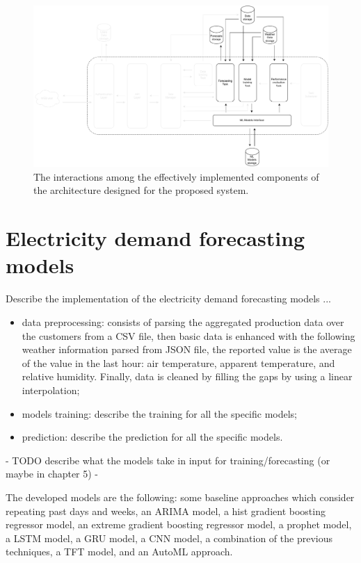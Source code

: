 \begin{figure}[t]
\centering
\includegraphics[width=1\textwidth]{images/implementation_interactions}
\caption{The interactions among the effectively implemented components of the architecture designed for the proposed system.}
\label{fig:implementationinteractions}
\end{figure}


\section{Electricity demand forecasting models}
\label{sec:demandimpl}
\vspace{0.2 cm}

Describe the implementation of the electricity demand forecasting models ...
\begin{itemize}
  \item data preprocessing: consists of parsing the aggregated production data over the customers from a CSV file, then basic data is enhanced with the following weather information parsed from JSON file, the reported value is the average of the value in the last hour: air temperature, apparent temperature, and relative humidity. Finally, data is cleaned by filling the gaps by using a linear interpolation;
  \item models training: describe the training for all the specific models;
  \item prediction: describe the prediction for all the specific models.
\end{itemize}


 - TODO describe what the models take in input for training/forecasting (or maybe in chapter 5) -


The developed models are the following: some baseline approaches which consider repeating past days and weeks, an ARIMA model, a hist gradient boosting regressor model, an extreme gradient boosting regressor model, a prophet model, a LSTM model, a GRU model, a CNN model, a combination of the previous techniques, a TFT model, and an AutoML approach.

